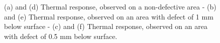\begin{figure}
  \hspace*{\fill}
	
	  \caption{(a) and (d) Thermal response, observed on a non-defective area - (b) and (e) 
	Thermal response, observed on an area with defect of 1 mm below surface - (c) and (f) 
	Thermal response, 
	observed on an area with defect of 0.5 mm below surface.}
	
  \label{fig:3}
\end{figure}

